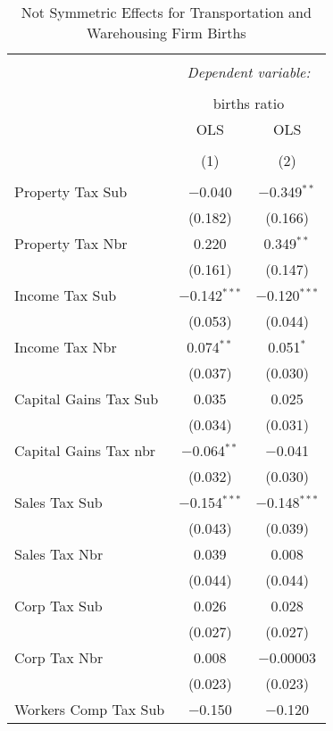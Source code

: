 
\begin{table}[!htbp] \centering 
  \caption{Not Symmetric Effects for  Transportation and Warehousing Firm Births} 
  \label{48-49noequality} 
\footnotesize 
\begin{tabular}{@{\extracolsep{5pt}}lcc} 
\\[-1.8ex]\hline 
\hline \\[-1.8ex] 
 & \multicolumn{2}{c}{\textit{Dependent variable:}} \\ 
\cline{2-3} 
\\[-1.8ex] & \multicolumn{2}{c}{births ratio} \\ 
 & OLS & OLS \\ 
\\[-1.8ex] & (1) & (2)\\ 
\hline \\[-1.8ex] 
 Property Tax Sub & $-$0.040 & $-$0.349$^{**}$ \\ 
  & (0.182) & (0.166) \\ 
  Property Tax Nbr & 0.220 & 0.349$^{**}$ \\ 
  & (0.161) & (0.147) \\ 
  Income Tax Sub & $-$0.142$^{***}$ & $-$0.120$^{***}$ \\ 
  & (0.053) & (0.044) \\ 
  Income Tax Nbr & 0.074$^{**}$ & 0.051$^{*}$ \\ 
  & (0.037) & (0.030) \\ 
  Capital Gains Tax Sub & 0.035 & 0.025 \\ 
  & (0.034) & (0.031) \\ 
  Capital Gains Tax nbr & $-$0.064$^{**}$ & $-$0.041 \\ 
  & (0.032) & (0.030) \\ 
  Sales Tax Sub & $-$0.154$^{***}$ & $-$0.148$^{***}$ \\ 
  & (0.043) & (0.039) \\ 
  Sales Tax Nbr & 0.039 & 0.008 \\ 
  & (0.044) & (0.044) \\ 
  Corp Tax Sub & 0.026 & 0.028 \\ 
  & (0.027) & (0.027) \\ 
  Corp Tax Nbr & 0.008 & $-$0.00003 \\ 
  & (0.023) & (0.023) \\ 
  Workers Comp Tax Sub & $-$0.150 & $-$0.120 \\ 

\end{tabular}
\end{table}
